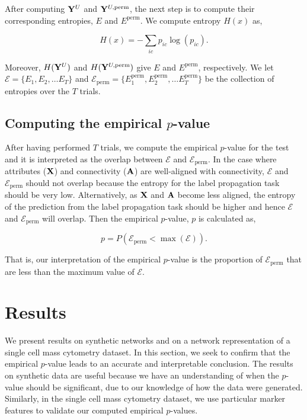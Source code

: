 After computing ${\bf Y}^{U}$ and ${\bf Y}^{U,\text{perm}}$, the next step is to compute their corresponding entropies, $E$ and $E^{\text{perm}}$. We compute entropy $H(x)$ as,

\begin{equation}
H(x)=-\sum_{ic}p_{ic}\log(p_{ic}).
\end{equation}

Moreover, $H({\bf Y}^{U})$ and $H({\bf Y}^{U,\text{perm}})$ give $E$ and $E^{\text{perm}}$, respectively. We let $\mathcal{E}=\{E_{1}, E_{2}, \dots E_{T}\}$ and $\mathcal{E}_{\text{perm}}=\{E_{1}^{\text{perm}}, E_{2}^{\text{perm}}, \dots E_{T}^{\text{perm}}\}$ be the collection of entropies over the $T$ trials. 

\subsection{Computing the empirical $p$-value}
After having performed $T$ trials, we compute the empirical $p$-value for the test and it is interpreted as the overlap between $\mathcal{E}$ and $\mathcal{E}_{\text{perm}}$. In the case where attributes (${\bf X}$) and connectivity (${\bf A}$) are well-aligned with connectivity, $\mathcal{E}$ and $\mathcal{E}_{\text{perm}}$ should not overlap because the entropy for the label propagation task should be very low. Alternatively, as ${\bf X}$ and ${\bf A}$ become less aligned, the entropy of the prediction from the label propagation task should be higher and hence $\mathcal{E}$ and $\mathcal{E}_{\text{perm}}$ will overlap. Then the empirical $p$-value, $p$ is calculated as,

\begin{equation}
p=P(\mathcal{E}_{\text{perm}}<\max(\mathcal{E})).
\end{equation}

That is, our interpretation of the empirical $p$-value is the proportion of $\mathcal{E}_{\text{perm}}$ that are less than the maximum value of $\mathcal{E}$. 
 

\section{Results}
We present results on synthetic networks and on a network representation of a single cell mass cytometry dataset. In this section, we seek to confirm that the empirical $p$-value leads to an accurate and interpretable conclusion. The results on synthetic data are useful because we have an understanding of when the $p$-value should be significant, due to our knowledge of how the data were generated. Similarly, in the single cell mass cytometry dataset, we use particular marker features to validate our computed empirical $p$-values. 

